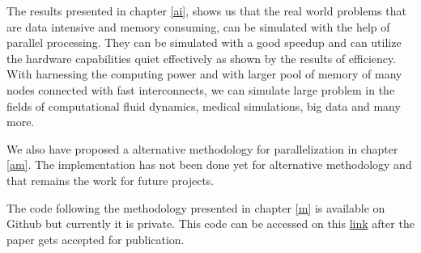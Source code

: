 The results presented in chapter \ref{ai}, shows us that the real world problems that are data intensive and memory consuming, can be simulated with the help of parallel processing. They can be simulated with a good speedup and can utilize the hardware capabilities quiet effectively as shown by the results of efficiency. With harnessing the computing power and with larger pool of memory of many nodes connected with fast interconnects, we can simulate large problem in the fields of computational fluid dynamics, medical simulations, big data and many more.  

\vspace{10pt}
\hspace{-18pt}We also have proposed a alternative methodology for parallelization in chapter \ref{am}. The implementation has not been done yet for alternative methodology and that remains the work for future projects. 

\vspace{10pt}
\hspace{-18pt}The code following the methodology presented in chapter \ref{m} is available on Github but currently it is private. This code can be accessed on this \href{}{link} after the paper \cite{arpit} gets accepted for publication.